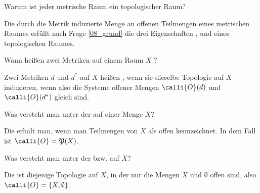 \begin{frage}
  Warum ist jeder metrische Raum ein topologischer Raum?
\end{frage}

\begin{antwort}
  Die durch die Metrik induzierte Menge an offenen Teilmengen 
  eines metrischen Raumes erfüllt nach Frage \ref{08_grund} 
  die drei Eigenschaften ,  und 
  eines topologischen Raumes.
  \AntEnd
\end{antwort}

\begin{frage}
  Wann heißen zwei Metriken auf einem Raum $X$ ?
\end{frage}

\begin{antwort}
  
  Zwei Metriken $d$ und $d^*$ auf $X$ heißen , 
  wenn sie dieselbe Topologie auf $X$ induzieren, wenn also die 
  Systeme offener Mengen $\calli{O}(d)$ und 
  $\calli{O}(d^*)$ gleich sind.\AntEnd
\end{antwort} 

\begin{frage}\label{08_klumpen}
  Was versteht man unter der  
  auf einer Menge $X$?
\end{frage}

\begin{antwort}
  
  Die  erhält man, 
  wenn man  Teilmengen 
  von $X$ als offen kennzeichnet. 
  In dem Fall ist $\calli{O} = \mathfrak{P}(X)$.
  \AntEnd
\end{antwort} 

\begin{frage}
  Was versteht man unter der  bzw. 
   auf $X$? 
\end{frage}   

\begin{antwort}
  Die  ist diejenige Topologie auf $X$, 
  in der nur die Mengen $X$ und $\emptyset$ offen sind, also 
  $\calli{O} = \{ X, \emptyset \}$.
  \AntEnd
  
\end{antwort}

